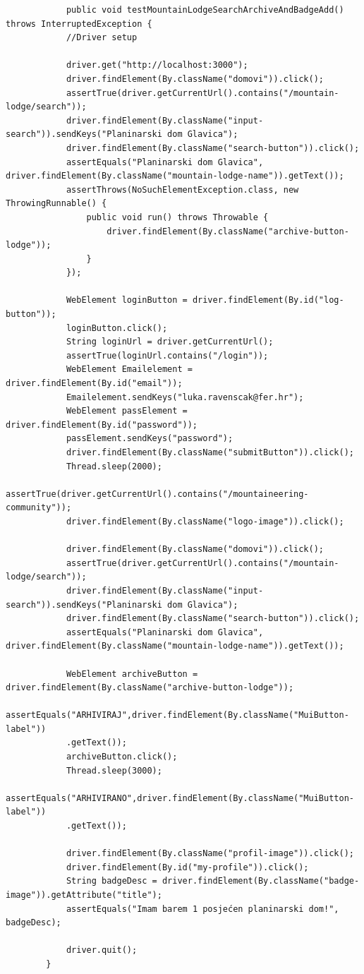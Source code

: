  		\begin{lstlisting}
 			public void testMountainLodgeSearchArchiveAndBadgeAdd() throws InterruptedException {
 			//Driver setup
 			
 			driver.get("http://localhost:3000");
 			driver.findElement(By.className("domovi")).click();
 			assertTrue(driver.getCurrentUrl().contains("/mountain-lodge/search"));
 			driver.findElement(By.className("input-search")).sendKeys("Planinarski dom Glavica");	    
 			driver.findElement(By.className("search-button")).click();
 			assertEquals("Planinarski dom Glavica", driver.findElement(By.className("mountain-lodge-name")).getText());
 			assertThrows(NoSuchElementException.class, new ThrowingRunnable() {
 				public void run() throws Throwable {
 					driver.findElement(By.className("archive-button-lodge"));
 				}
 			});
 			
 			WebElement loginButton = driver.findElement(By.id("log-button"));
 			loginButton.click();
 			String loginUrl = driver.getCurrentUrl();
 			assertTrue(loginUrl.contains("/login"));
 			WebElement Emailelement = driver.findElement(By.id("email"));        
 			Emailelement.sendKeys("luka.ravenscak@fer.hr");   
 			WebElement passElement = driver.findElement(By.id("password"));
 			passElement.sendKeys("password");
 			driver.findElement(By.className("submitButton")).click();
 			Thread.sleep(2000);
 			assertTrue(driver.getCurrentUrl().contains("/mountaineering-community"));
 			driver.findElement(By.className("logo-image")).click();
 			
 			driver.findElement(By.className("domovi")).click();
 			assertTrue(driver.getCurrentUrl().contains("/mountain-lodge/search"));
 			driver.findElement(By.className("input-search")).sendKeys("Planinarski dom Glavica");	    
 			driver.findElement(By.className("search-button")).click();
 			assertEquals("Planinarski dom Glavica", driver.findElement(By.className("mountain-lodge-name")).getText());
 			
 			WebElement archiveButton = driver.findElement(By.className("archive-button-lodge"));
 			assertEquals("ARHIVIRAJ",driver.findElement(By.className("MuiButton-label"))
 			.getText());
 			archiveButton.click();
 			Thread.sleep(3000);
 			assertEquals("ARHIVIRANO",driver.findElement(By.className("MuiButton-label"))
 			.getText());
 			
 			driver.findElement(By.className("profil-image")).click();
 			driver.findElement(By.id("my-profile")).click();
 			String badgeDesc = driver.findElement(By.className("badge-image")).getAttribute("title");
 			assertEquals("Imam barem 1 posjećen planinarski dom!", badgeDesc);
 			
 			driver.quit();
 		}
 		\end{lstlisting}
 	

